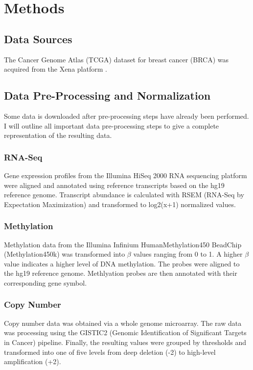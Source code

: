 \section{Methods}
\countem

\subsection{Data Sources}

The Cancer Genome Atlas (TCGA) dataset for breast cancer (BRCA)\cite{Ciriello2015} was acquired from the Xena platform \cite{Goldman2018}.

\subsection{Data Pre-Processing and Normalization}

Some data is downloaded after pre-processing steps have already been performed.
I will outline all important data pre-processing steps to give a complete representation of the resulting data.

\subsubsection{RNA-Seq}

Gene expression profiles from the Illumina HiSeq 2000 RNA sequencing platform were aligned and annotated using reference transcripts based on the hg19 reference genome.
Transcript abundance is calculated with RSEM (RNA-Seq by Expectation Maximization) and transformed to log2(x+1) normalized values.

\subsubsection{Methylation}

Methylation data from the Illumina Infinium HumanMethylation450 BeadChip (Methylation450k) was transformed into $\beta$ values ranging from 0 to 1.
A higher $\beta$ value indicates a higher level of DNA methylation.
The probes were aligned to the hg19 reference genome.
Methlyation probes are then annotated with their corresponding gene symbol.

\subsubsection{Copy Number}

Copy number data was obtained via a whole genome microarray.
The raw data was processing using the GISTIC2 (Genomic Identification of Significant Targets in Cancer) pipeline.
Finally, the resulting values were grouped by thresholds and transformed into one of five levels from deep deletion (-2) to high-level amplification (+2).

